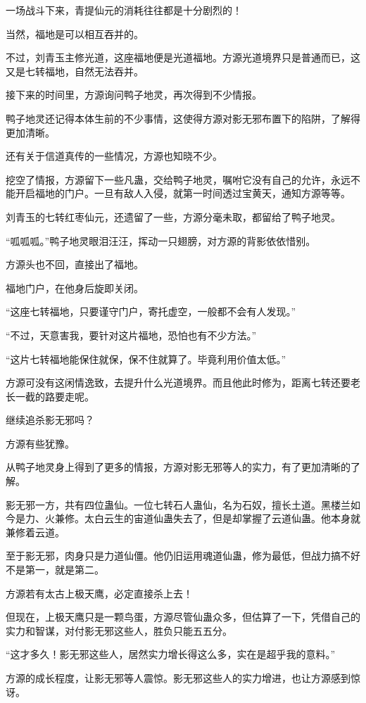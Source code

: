\begin{this_body}
一场战斗下来，青提仙元的消耗往往都是十分剧烈的！

当然，福地是可以相互吞并的。

不过，刘青玉主修光道，这座福地便是光道福地。方源光道境界只是普通而已，这又是七转福地，自然无法吞并。

接下来的时间里，方源询问鸭子地灵，再次得到不少情报。

鸭子地灵还记得本体生前的不少事情，这使得方源对影无邪布置下的陷阱，了解得更加清晰。

还有关于信道真传的一些情况，方源也知晓不少。

挖空了情报，方源留下一些凡蛊，交给鸭子地灵，嘱咐它没有自己的允许，永远不能开启福地的门户。一旦有敌人入侵，就第一时间透过宝黄天，通知方源等等。

刘青玉的七转红枣仙元，还遗留了一些，方源分毫未取，都留给了鸭子地灵。

“呱呱呱。”鸭子地灵眼泪汪汪，挥动一只翅膀，对方源的背影依依惜别。

方源头也不回，直接出了福地。

福地门户，在他身后旋即关闭。

“这座七转福地，只要谨守门户，寄托虚空，一般都不会有人发现。”

“不过，天意害我，要针对这片福地，恐怕也有不少方法。”

“这片七转福地能保住就保，保不住就算了。毕竟利用价值太低。”

方源可没有这闲情逸致，去提升什么光道境界。而且他此时修为，距离七转还要老长一截的路要走呢。

继续追杀影无邪吗？

方源有些犹豫。

从鸭子地灵身上得到了更多的情报，方源对影无邪等人的实力，有了更加清晰的了解。

影无邪一方，共有四位蛊仙。一位七转石人蛊仙，名为石奴，擅长土道。黑楼兰如今是力、火兼修。太白云生的宙道仙蛊失去了，但是却掌握了云道仙蛊。他本身就兼修着云道。

至于影无邪，肉身只是力道仙僵。他仍旧运用魂道仙蛊，修为最低，但战力搞不好不是第一，就是第二。

方源若有太古上极天鹰，必定直接杀上去！

但现在，上极天鹰只是一颗鸟蛋，方源尽管仙蛊众多，但估算了一下，凭借自己的实力和智谋，对付影无邪这些人，胜负只能五五分。

“这才多久！影无邪这些人，居然实力增长得这么多，实在是超乎我的意料。”

方源的成长程度，让影无邪等人震惊。影无邪这些人的实力增进，也让方源感到惊讶。


\end{this_body}
